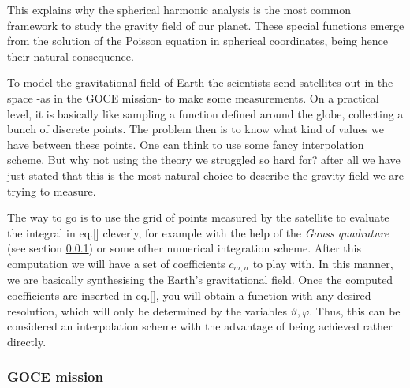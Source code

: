 This explains why the spherical harmonic analysis is the most common framework to study the gravity field of our planet. These special 
functions emerge from the solution of the Poisson equation in spherical coordinates, being hence their natural consequence. 

To model the gravitational field of Earth the scientists send satellites out in the space -as in the GOCE mission- to make some measurements. 
On a practical level, it is basically like sampling a function defined around the globe, collecting a bunch of discrete points. 
The problem then is to know what kind of values we have between these points. One can think to use some fancy interpolation scheme. 
But why not using the theory we struggled so hard for? after all we have just stated that this is the most natural choice to 
describe the gravity field we are trying to measure.

The way to go is to use the grid of points measured by the satellite to evaluate the integral in eq.\eqref{} cleverly, for example with the help of 
the \emph{Gauss quadrature} (see section \ref{}) or some other numerical integration scheme. After this computation we will have a set of 
coefficients $c_{m,n}$ to play with. In this manner, we are basically synthesising the Earth's gravitational field. Once the computed coefficients are 
inserted in eq.\eqref{}, you will obtain a function with any desired resolution, which will only be determined by the variables $\vartheta, \varphi$. Thus, this can
be considered an interpolation scheme with the advantage of being achieved rather directly.


\subsubsection{GOCE mission}


